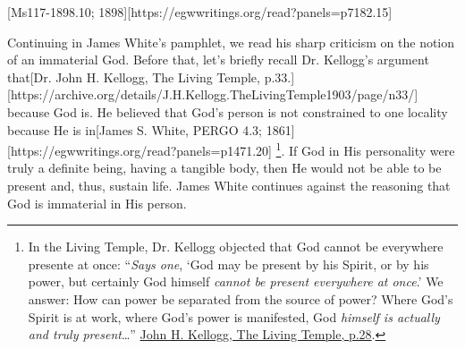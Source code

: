 [Ms117-1898.10; 1898][https://egwwritings.org/read?panels=p7182.15]


Continuing in James White’s pamphlet, we read his sharp criticism on the notion of an immaterial God. Before that, let’s briefly recall Dr. Kellogg’s argument that[Dr. John H. Kellogg, The Living Temple, p.33.][https://archive.org/details/J.H.Kellogg.TheLivingTemple1903/page/n33/] because God is. He believed that God’s person is not constrained to one locality because He is in[James S. White, PERGO 4.3; 1861][https://egwwritings.org/read?panels=p1471.20] \footnote{In the Living Temple, Dr. Kellogg objected that God cannot be everywhere presente at once: “\textit{Says one}, ‘God may be present by his Spirit, or by his power, but certainly God himself \textit{cannot be present everywhere at once}.’ We answer: How can power be separated from the source of power? Where God’s Spirit is at work, where God’s power is manifested, God \textit{himself is actually and truly present}…” \href{https://archive.org/details/J.H.Kellogg.TheLivingTemple1903/page/n29/}{John H. Kellogg, The Living Temple, p.28}.}. If God in His personality were truly a definite being, having a tangible body, then He would not be able to be present and, thus, sustain life. James White continues against the reasoning that God is immaterial in His person.


